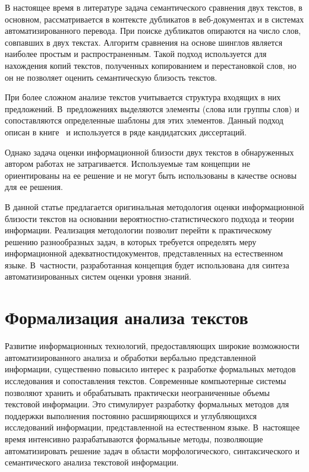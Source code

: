 \begin{multicols}{2}
   В настоящее время в литературе задача семантического сравнения двух 
текстов, в основном, рас\-смат\-ри\-ва\-ется в контексте дубликатов в 
   веб-докумен\-тах и в системах автоматизированного перевода. При 
поиске дубликатов опираются на число слов, совпавших в двух текстах. 
Алгоритм сравнения на основе шинглов является наиболее простым и 
распространенным. Такой подход используется для нахождения копий 
текстов, полученных копированием и перестановкой слов, но он не позволяет 
оценить семантическую близость текстов.
   
   При более сложном анализе текстов учитывается структура входящих в 
них предложений. В~предложениях выделяются элементы (слова или группы 
слов) и сопоставляются определенные шаблоны для этих элементов. Данный 
подход описан в книге~\cite{2-k} и используется в ряде кандидатских 
диссертаций. 
   
   Однако задача оценки информационной бли\-зости двух текстов в 
обнаруженных автором работах не затрагивается. Используемые там 
концепции не ориентированы на ее решение и не могут быть использованы в 
качестве основы для ее решения.
   
   В данной статье предлагается оригинальная методология оценки 
информационной близости текстов на основании вероятностно-ста\-ти\-сти\-че\-ско\-го 
подхода и теории информации. Реализация методологии 
позволит перейти к практическому решению разнообразных задач, в которых 
требуется определять меру информационной адекватности\linebreak документов, 
представленных на естественном языке. В~част\-ности, разработанная 
концепция будет использована для синтеза автоматизированных сис\-тем 
оценки уровня знаний. 

\section{Формализация анализа текстов}

   Развитие информационных технологий, предо\-став\-ля\-ющих широкие 
возможности ав\-то\-ма\-ти\-зи\-рован\-но\-го анализа и обработки вербально 
пред\-став\-лен\-ной информации, существенно повысило интерес к разработке 
формальных методов исследования и сопоставления текстов. Современные 
компьютерные системы позволяют хранить и обрабатывать практически 
неограниченные объемы текстовой информации. Это стимулирует 
разработку формальных методов для поддержки выполнения постоянно 
расширяющихся и углубляющихся исследований информации, 
представленной на естественном языке. В~настоящее время интенсивно 
разрабатываются формальные методы, позволяющие автоматизировать 
решение задач в области морфологического, синтаксического и 
семантического анализа текстовой информации. 
   

\end{multicols}
